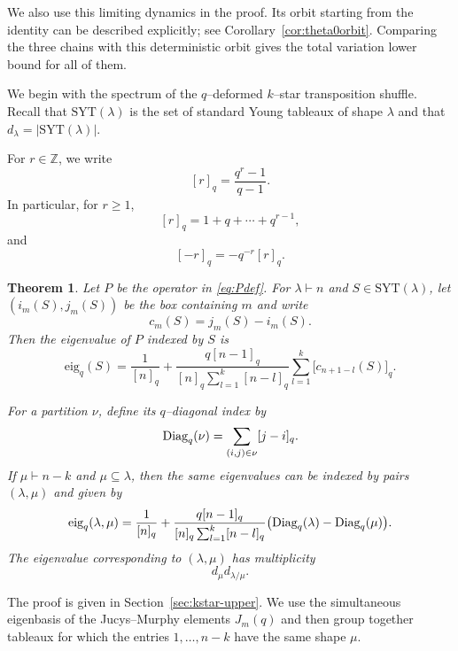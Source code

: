 \documentclass[11pt]{article}
\theoremstyle{plain}  %
\newtheorem{theorem}{Theorem}[section]
\newcommand{\eig}{\text{eig}} %
\begin{document}
We also use this limiting dynamics in the proof. Its orbit starting from the
identity can be described explicitly; see
Corollary~\ref{cor:theta0orbit}. Comparing the three chains with this
deterministic orbit gives the total variation lower bound for all of them.


We begin with the spectrum of the $q$--deformed $k$--star transposition
shuffle. Recall that $\mathrm{SYT}(\lambda)$ is the set of standard Young
tableaux of shape $\lambda$ and that
$d_\lambda=|\mathrm{SYT}(\lambda)|$.

For $r\in\mathbb{Z}$, we write
\[
    [r]_q=\frac{q^r-1}{q-1}.
\]
In particular, for $r\geq 1$,
\[
    [r]_q=1+q+\cdots+q^{r-1},
\]
and
\[
    [-r]_q=-q^{-r}[r]_q.
\]

\begin{theorem}\label{T-EVHeckeCombined}
Let $P$ be the operator in \eqref{eq:Pdef}. For $\lambda\vdash n$ and
$S\in\mathrm{SYT}(\lambda)$, let $(i_m(S),j_m(S))$ be the box containing
$m$ and write
\[
    c_m(S)=j_m(S)-i_m(S).
\]
Then the eigenvalue of $P$ indexed by $S$ is
\begin{equation}\label{eq:EVHeckeSYT}
\eig_q(S)
=
\frac{1}{[n]_q}
+
\frac{q[n-1]_q}
     {[n]_q\sum_{l=1}^{k}[n-l]_q}
\sum_{l=1}^{k}
\big[c_{n+1-l}(S)\big]_q .
\end{equation}

For a partition $\nu$, define its $q$--diagonal index by
\[
    \textup{Diag}_q(\nu)
    =
    \sum_{(i,j)\in\nu}[j-i]_q.
\]
If $\mu\vdash n-k$ and $\mu\subseteq\lambda$, then the same eigenvalues can be
indexed by pairs $(\lambda,\mu)$ and given by
\begin{equation}\label{eq:EVHeckeDiag}
\eig_q(\lambda,\mu)
=
\frac{1}{[n]_q}
+
\frac{q[n-1]_q}
     {[n]_q\sum_{l=1}^{k}[n-l]_q}
\bigl(
\textup{Diag}_q(\lambda)-\textup{Diag}_q(\mu)
\bigr).
\end{equation}
The eigenvalue corresponding to $(\lambda,\mu)$ has multiplicity
\[
    d_\mu d_{\lambda/\mu}.
\]
\end{theorem}

The proof is given in Section~\ref{sec:kstar-upper}. We use the simultaneous
eigenbasis of the Jucys--Murphy elements $J_m(q)$ and then group together
tableaux for which the entries $1,\ldots,n-k$ have the same shape $\mu$.
\end{document}

